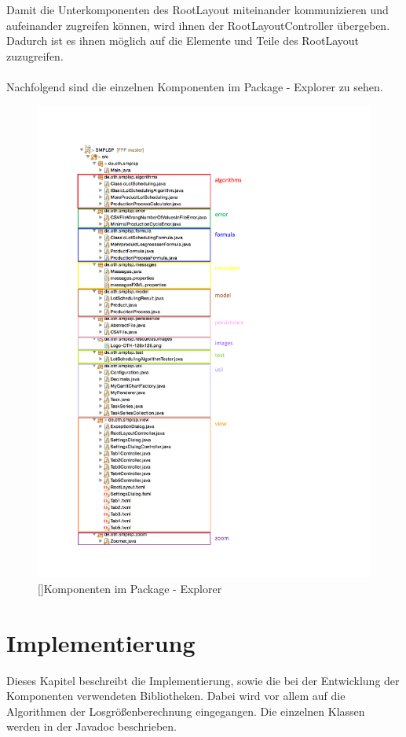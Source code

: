 \documentclass[12pt,a4paper, listof=entryprefix, bibliography=totocnumbered,toc=listofnumbered,lof=listofnumbered]{scrartcl}
\begin{document}
Damit die Unterkomponenten des RootLayout miteinander kommunizieren und aufeinander zugreifen können, wird ihnen der RootLayoutController übergeben. Dadurch ist es ihnen möglich auf die Elemente und Teile des RootLayout zuzugreifen.
\\\\
Nachfolgend sind die einzelnen Komponenten im Package - Explorer zu sehen.

\begin{figure}[H]
	\centering
	\includegraphics[width=0.8\linewidth]{Bilder/packages_beschriftet.pdf} 
	[]{Komponenten im Package - Explorer}
	\label{fig:osgi}
\end{figure}


\section{Implementierung}
Dieses Kapitel beschreibt die Implementierung, sowie die bei der Entwicklung der Komponenten verwendeten Bibliotheken. Dabei wird vor allem auf die Algorithmen der Losgrößenberechnung eingegangen. Die einzelnen Klassen werden in der Javadoc beschrieben.
 
\end{document}
